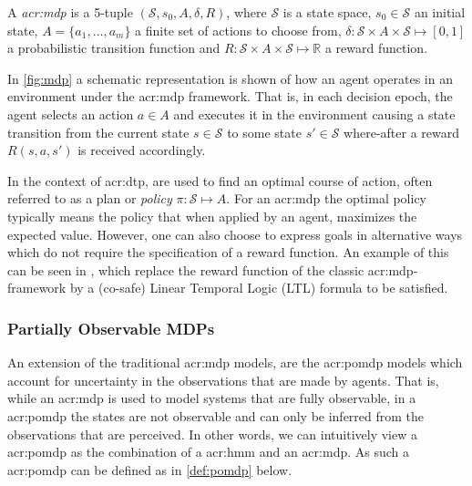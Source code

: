 \begin{definition}
	\label{def:mdp}
	A \textit{\acrfull{acr:mdp}} is a 5-tuple $(\mathcal{S}, s_0, A, \delta, R)$, where $\mathcal{S}$ is a state space, $s_0 \in \mathcal{S}$ an initial state, $A = \{a_1, \ldots, a_m\}$ a finite set of actions to choose from, $\delta: \mathcal{S} \times A \times \mathcal{S} \mapsto [0, 1]$ a probabilistic transition function and $R: \mathcal{S} \times A \times \mathcal{S} \mapsto \mathbb{R}$ a reward function.
\end{definition}

In \autoref{fig:mdp} a schematic representation is shown of how an agent operates in an environment under the \acrshort{acr:mdp} framework.
That is, in each decision epoch, the agent selects an action $a \in A$ and executes it in the environment causing a state transition from the current state $s \in \mathcal{S}$ to some state $s' \in \mathcal{S}$ where-after a reward $R(s, a, s')$ is received accordingly.

In the context of \acrshort{acr:dtp},  are used to find an optimal course of action, often referred to as a plan or \textit{policy} $\pi: \mathcal{S} \mapsto A$.
For an \acrshort{acr:mdp} the optimal policy typically means the policy that when applied by an agent, maximizes the expected value.
However, one can also choose to express goals in alternative ways which do not require the specification of a reward function.
An example of this can be seen in \cite{bhatia2010sampling, lacerda2015optimal}, which replace the reward function of the classic \acrshort{acr:mdp}-framework by a (co-safe) Linear Temporal Logic (LTL) formula to be satisfied.

\subsubsection{Partially Observable MDPs}
\label{sec:pomdps}


An extension of the traditional \acrshort{acr:mdp} models, are the \acrfull{acr:pomdp} models which account for uncertainty in the observations that are made by agents.
That is, while an \acrshort{acr:mdp} is used to model systems that are fully observable, in a \acrshort{acr:pomdp} the states are not observable and can only be inferred from the observations that are perceived.
In other words, we can intuitively view a \acrshort{acr:pomdp} as the combination of a \acrshort{acr:hmm} and an \acrshort{acr:mdp}.
As such a \acrshort{acr:pomdp} can be defined as in \autoref{def:pomdp} below.

